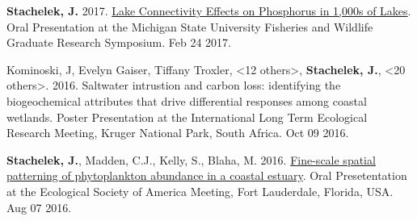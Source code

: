 \documentclass[11pt]{article}
\makeatletter
\newlength{\bibhang}
\newlength{\bibsep}
 {\@listi \global\bibsep\itemsep \global\advance\bibsep by\parsep}
\newenvironment{bibenum*}
  {\renewcommand\labelenumi{[\theenumi]}%
   \etaremune[
     topsep=0pt,
     itemsep=\bibsep,
     parsep=0pt,partopsep=0pt,
     itemindent=-\bibhang,
     leftmargin=0.8em
     ]
     }
  {\endetaremune}
\makeatother
\begin{document}
\begin{bibenum*}
    \item \textbf{Stachelek, J.} 2017. \href{https://doi.org/10.6084/m9.figshare.8187038.v1}{Lake Connectivity Effects on Phosphorus in 1,000s of Lakes}. Oral Presentation at the Michigan State University Fisheries and Wildlife Graduate Research Symposium. Feb 24 2017.

    \item Kominoski, J, Evelyn Gaiser, Tiffany Troxler, <12 others>, \textbf{Stachelek, J.}, <20 others>. 2016. Saltwater intrustion and carbon loss: identifying the biogeochemical attributes that drive differential responses among coastal wetlands. Poster Presentation at the International Long Term Ecological Research Meeting, Kruger National Park, South Africa. Oct 09 2016.

    \item \textbf{Stachelek, J.}, Madden, C.J., Kelly, S., Blaha, M. 2016. \href{https://doi.org/10.6084/m9.figshare.2775322.v4}{Fine-scale spatial patterning of phytoplankton abundance in a coastal estuary}. Oral Presetentation at the Ecological Society of America Meeting, Fort Lauderdale, Florida, USA. Aug 07 2016.


\end{bibenum*}
\end{document}
